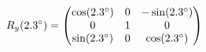 \documentclass[preview]{standalone}
\begin{document}
\begin{align*}
\special{dvisvgm:raw <g id='unique000'>}R_y(2.3^\circ) = \begin{pmatrix} \cos(2.3^\circ) & 0 & -\sin(2.3^\circ) \\ 0 & 1 & 0 \\ \sin(2.3^\circ) & 0 & \cos(2.3^\circ) \end{pmatrix}\special{dvisvgm:raw </g>}
\end{align*}
\end{document}
